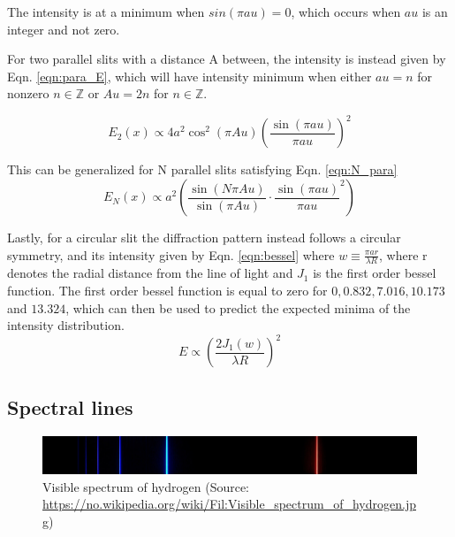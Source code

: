 \documentclass[11pt,a4paper]{article}
\begin{document}
    The intensity is at a minimum when $sin(\pi a u) = 0$, which occurs when $au$ is an integer and not zero.

    For two parallel slits with a distance A between, the intensity is instead given by Eqn. \ref{eqn:para_E}, which will have intensity minimum when either $au = n$ for nonzero $n \in \mathbb Z$ or $Au = 2n$ for $n \in \mathbb Z$.

    \begin{equation}
      E_2(x) \propto 4a^2\cos^2(\pi A u) \left( \frac{\sin(\pi a u)}{\pi a u} \right)^2
      \label{eqn:para_E}
    \end{equation}

    This can be generalized for N parallel slits satisfying Eqn. \ref{eqn:N_para}
    \begin{equation}
      E_N(x) \propto a^2 
          \left(
          \frac{\sin (N \pi A u)}{\sin (\pi A u)} \cdot
          \frac{\sin (\pi a u)}{\pi a u}^2
          \right)
          \label{eqn:N_para}
    \end{equation}

    Lastly, for a circular slit the diffraction pattern instead follows a circular symmetry, and its intensity given by Eqn. \ref{eqn:bessel} where $w \equiv \frac{\pi a r}{\lambda R}$, where r denotes the radial distance from the line of light and $J_1$ is the first order bessel function. The first order bessel function is equal to zero for $0, 0.832, 7.016, 10.173$ and $13.324$, which can then be used to predict the expected minima of the intensity distribution.
    \begin{equation}
      E \propto \left( \frac{2 J_1 (w)}{\lambda R} \right)^2
      \label{eqn:bessel}
    \end{equation}


    \subsection{Spectral lines}

      \begin{figure}[H]
        \center 
        \includegraphics[width=12cm]{scripts/figs/Visible_spectrum_of_hydrogen.jpg}
        \caption{Visible spectrum of hydrogen (Source: \url{https://no.wikipedia.org/wiki/Fil:Visible_spectrum_of_hydrogen.jpg})}
        \label{fig:balmer_lines}
      \end{figure}
\end{document}
